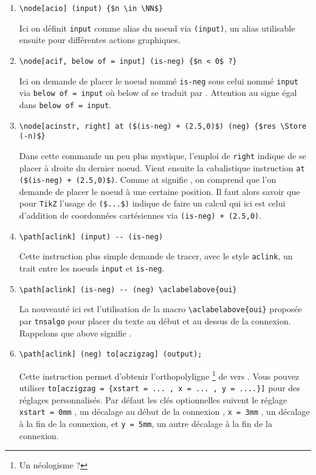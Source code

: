 \documentclass[12pt,a4paper]{article}
\newcommand\Store{\leftarrow}
\begin{document}
\begin{enumerate}
	\item \verb+\node[acio] (input) {$n \in \NN$}+
	      
	      \smallskip
	      Ici on définit \verb+input+ comme alias du noeud via \verb+(input)+, un alias utilisable ensuite pour différentes actions graphiques. 

	\medskip
	\item \verb+\node[acif, below of = input] (is-neg) {$n < 0$ ?}+

	      \smallskip
	      Ici on demande de placer le noeud nommé \verb+is-neg+ sous celui nommé \verb+input+ via \verb+below of = input+ où \og below of \fg{} se traduit par .
	      Attention au signe égal dans \verb+below of = input+.
	
	\medskip
	\item \verb|\node[acinstr, right] at ($(is-neg) + (2.5,0)$) (neg) {$res \Store (-n)$}|
	      
	      \smallskip
	      Dans cette commande un peu plus mystique, l'emploi de \verb+right+ indique de se placer à droite du dernier noeud.
	      Vient ensuite la cabalistique instruction \verb|at ($(is-neg) + (2.5,0)$)|.
	      Comme \og at \fg{} signifie , on comprend que l'on demande de placer le noeud à une certaine position.
	       Il faut alors savoir que pour \verb#TikZ# l'usage de \verb|($...$)| indique de faire un calcul qui ici est celui d'addition de coordonnées cartésiennes via \verb|(is-neg) + (2.5,0)|. 
	
	\medskip
	\item \verb+\path[aclink] (input) -- (is-neg)+
	      
	      \smallskip
	      Cette instruction plus simple demande de tracer, avec le style \verb+aclink+, un trait entre les noeuds \verb+input+ et \verb+is-neg+.
	
	\medskip
	\item \verb+\path[aclink] (is-neg) -- (neg) \aclabelabove{oui}+
	      
	      \smallskip
	      La nouveauté ici est l'utilisation de la macro \verb+\aclabelabove{oui}+ proposée par \verb#tnsalgo# pour placer du texte au début et au dessus de la connexion.
	      Rappelons que \og above \fg{} signifie . 

	\medskip
	\item \verb+\path[aclink] (neg) to[aczigzag] (output);+
	      
	      \smallskip
	      Cette instruction permet d'obtenir \og l'orthopolyligne \fg{} 
	      \footnote{
	          Un néologisme ?
	      }
	      de \fbox{$res \Store (-n)$} vers  .
	      Vous pouvez utiliser \verb+to[aczigzag = {xstart = ... , x = ... , y = ....}]+ pour des réglages personnalisés.
	      Par défaut les clés optionnelles suivent le réglage \verb+xstart = 0mm+ , un décalage au début de la connexion , \verb+x = 3mm+ , un décalage à la fin de la connexion, et \verb+y = 5mm+, un autre décalage à la fin de la connexion.
\end{enumerate}
\end{document}
